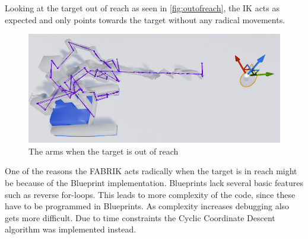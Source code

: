 Looking at the target out of reach as seen in \autoref{fig:outofreach}, the IK acts as expected and only points towards the target without any radical movements. 

\begin{figure}[H]
	\centering
	\includegraphics[width=\textwidth]{FABRIK/Robot_OutOfReach.PNG}
	\caption{The arms when the target is out of reach}
	\label{fig:outofreach}
\end{figure}

One of the reasons the FABRIK acts radically when the target is in reach might be because of the Blueprint implementation. Blueprints lack several basic features such as reverse for-loops. This leads to more complexity of the code, since these have to be programmed in Blueprints. As complexity increases debugging also gets more difficult. 
Due to time constraints the Cyclic Coordinate Descent algorithm was implemented instead. 